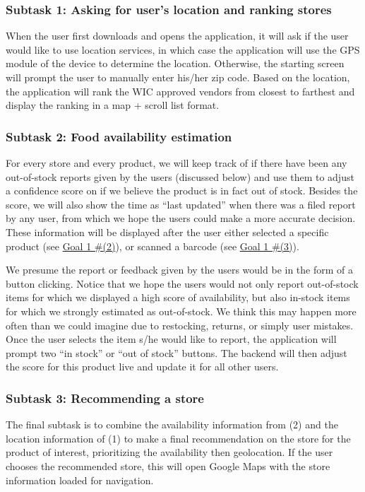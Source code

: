 \documentclass{article}
\begin{document}
\subsubsection*{Subtask 1: Asking for user’s location and ranking stores}
When the user first downloads and opens the application, it will ask if the user would like to use location services, in which case the application will use the GPS module of the device to determine the location. Otherwise, the starting screen will prompt the user to manually enter his/her zip code. Based on the location, the application will rank the WIC approved vendors from closest to farthest and display the ranking in a map + scroll list format.

\subsubsection*{Subtask 2: Food availability estimation}
For every store and every product, we will keep track of if there have been any out-of-stock reports given by the users (discussed below) and use them to adjust a confidence score on if we believe the product is in fact out of stock. Besides the score, we will also show the time as “last updated” when there was a filed report by any user, from which we hope the users could make a more accurate decision. These information will be displayed after the user either selected a specific product (see \hyperref[sec:goal]{Goal 1 \#(2)}), or scanned a barcode (see \hyperref[sec:goal13]{Goal 1 \#(3)}). \par
We presume the report or feedback given by the users would be in the form of a button clicking. Notice that we hope the users would not only report out-of-stock items for which we displayed a high score of availability, but also in-stock items for which we strongly estimated as out-of-stock. We think this may happen more often than we could imagine due to restocking, returns, or simply user mistakes. Once the user selects the item s/he would like to report, the application will prompt two “in stock” or “out of stock” buttons. The backend will then adjust the score for this product live and update it for all other users.\par

\subsubsection*{Subtask 3: Recommending a store}
The final subtask is to combine the availability information from (2) and the location information of (1) to make a final recommendation on the store for the product of interest, prioritizing the availability then geolocation. If the user chooses the recommended store, this will open Google Maps with the store information loaded for navigation. 
\end{document}
